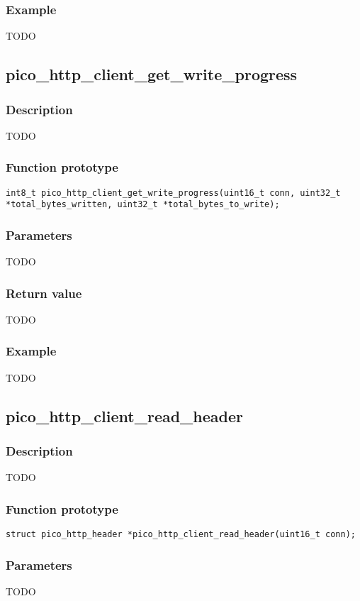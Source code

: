 \subsubsection*{Example}
TODO


\subsection{pico\_http\_client\_get\_write\_progress}

\subsubsection*{Description}
TODO

\subsubsection*{Function prototype}
\texttt{int8\_t pico\_http\_client\_get\_write\_progress(uint16\_t conn, uint32\_t *total\_bytes\_written, uint32\_t *total\_bytes\_to\_write);}

\subsubsection*{Parameters}
TODO
\subsubsection*{Return value}
TODO
\subsubsection*{Example}
TODO


\subsection{pico\_http\_client\_read\_header}

\subsubsection*{Description}
TODO

\subsubsection*{Function prototype}
\texttt{struct pico\_http\_header *pico\_http\_client\_read\_header(uint16\_t conn);}

\subsubsection*{Parameters}
TODO
